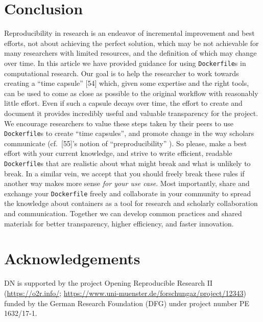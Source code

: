 \documentclass[10pt,letterpaper]{article}
\begin{document}
\hypertarget{conclusion}{%
\section*{Conclusion}\label{conclusion}}

Reproducibility in research is an endeavor of incremental improvement
and best efforts, not about achieving the perfect solution, which may be
not achievable for many researchers with limited resources, and the
definition of which may change over time. In this article we have
provided guidance for using \texttt{Dockerfile}s in computational
research. Our goal is to help the researcher to work towards creating a
``time capsule'' {[}54{]} which, given some expertise and the right
tools, can be used to come as close as possible to the original workflow
with reasonably little effort. Even if such a capsule decays over time,
the effort to create and document it provides incredibly useful and
valuable transparency for the project. We encourage researchers to value
these steps taken by their peers to use \texttt{Dockerfile}s to create
``time capsules'', and promote change in the way scholars communicate
(cf.~{[}55{]}'s notion of ``preproducibility'' ). So please, make a best
effort with your current knowledge, and strive to write efficient,
readable \texttt{Dockerfile}s that are realistic about what might break
and what is unlikely to break. In a similar vein, we accept that you
should freely break these rules if another way makes more sense
\emph{for your use case}. Most importantly, share and exchange your
\texttt{Dockerfile} freely and collaborate in your community to spread
the knowledge about containers as a tool for research and scholarly
collaboration and communication. Together we can develop common
practices and shared materials for better transparency, higher
efficiency, and faster innovation.

\hypertarget{acknowledgements}{%
\section*{Acknowledgements}\label{acknowledgements}}

DN is supported by the project Opening Reproducible Research II
(\href{https://o2r.info/}{https://o2r.info/};
\href{https://www.uni-muenster.de/forschungaz/project/12343}{https://www.uni-muenster.de/forschungaz/project/12343})
funded by the German Research Foundation (DFG) under project number PE
1632/17-1.
\end{document}
